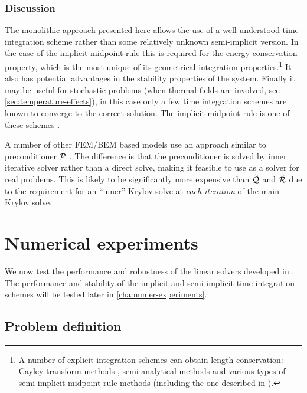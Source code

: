 \subsubsection{Discussion}

The monolithic approach presented here allows the use of a well understood time integration scheme rather than some relatively unknown semi-implicit version.
In the case of the implicit midpoint rule this is required for the energy conservation property, which is the most unique of its geometrical integration properties.\footnote{A number of explicit integration schemes can obtain length conservation: Cayley transform methods \cite{Lewis2003}, semi-analytical methods \cite{Wiele2010} and various types of semi-implicit midpoint rule methods \cite{Spargo2003} \cite{Mentink2010} (including the one described in ).}
It also has potential advantages in the stability properties of the system.
Finally it may be useful for stochastic problems (\ie when thermal fields are involved, see \cref{sec:temperature-effects}), in this case only a few time integration schemes are known to converge to the correct solution.
The implicit midpoint rule is one of these schemes \cite{DAquino2006}.


A number of other FEM/BEM based models use an approach similar to preconditioner $\mathcal{P}$ \cite{Suess2002}.
The difference is that the preconditioner is solved by inner iterative solver rather than a direct solve, making it feasible to use as a solver for real problems.
This is likely to be significantly more expensive than $\widetilde{\mathcal{Q}}$ and $\widetilde{\mathcal{R}}$ due to the requirement for an ``inner'' Krylov solve at \emph{each iteration} of the main Krylov solve.


\section{Numerical experiments}
\label{sec:numer-exper-fem-bem-systems}

We now test the performance and robustness of the linear solvers developed in .
The performance and stability of the implicit and semi-implicit time integration schemes will be tested later in \cref{cha:numer-experiments}.


\subsection{Problem definition}

